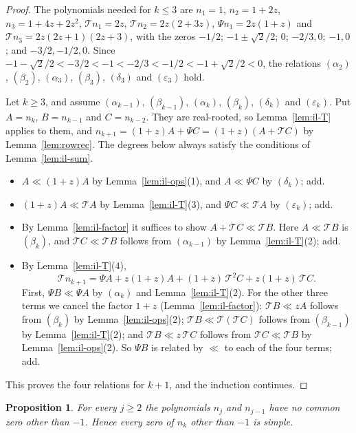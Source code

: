 \documentclass[11pt]{amsart}
\newtheorem{proposition}[theorem]{Proposition}
\theoremstyle{definition}
\begin{document}
\begin{proof}
The polynomials needed for $k\le3$ are $n_1=1$, $n_2=1+2z$, $n_3=1+4z+2z^2$, $\mathcal Tn_1=2z$, $\mathcal Tn_2=2z(2+3z)$, $\Psi n_1=2z(1+z)$ and $\mathcal Tn_3=2z(2z+1)(2z+3)$, with the zeros $-1/2$; $-1\pm\sqrt2/2$; $0$; $-2/3,0$; $-1,0$; and $-3/2,-1/2,0$. Since $-1-\sqrt2/2<-3/2<-1<-2/3<-1/2<-1+\sqrt2/2<0$, the relations $(\alpha_2)$, $(\beta_2)$, $(\alpha_3)$, $(\beta_3)$, $(\delta_3)$ and $(\varepsilon_3)$ hold.

Let $k\ge3$, and assume $(\alpha_{k-1})$, $(\beta_{k-1})$, $(\alpha_k)$, $(\beta_k)$, $(\delta_k)$ and $(\varepsilon_k)$. Put $A=n_k$, $B=n_{k-1}$ and $C=n_{k-2}$. They are real-rooted, so Lemma~\ref{lem:il-T} applies to them, and $n_{k+1}=(1+z)A+\Psi C=(1+z)(A+\mathcal TC)$ by Lemma~\ref{lem:rowrec}. The degrees below always satisfy the conditions of Lemma~\ref{lem:il-sum}.
\begin{itemize}
\item[$(\alpha_{k+1})$] $A\ll(1+z)A$ by Lemma~\ref{lem:il-ops}(1), and $A\ll\Psi C$ by $(\delta_k)$; add.
\item[$(\beta_{k+1})$] $(1+z)A\ll\mathcal TA$ by Lemma~\ref{lem:il-T}(3), and $\Psi C\ll\mathcal TA$ by $(\varepsilon_k)$; add.
\item[$(\delta_{k+1})$] By Lemma~\ref{lem:il-factor} it suffices to show $A+\mathcal TC\ll\mathcal TB$. Here $A\ll\mathcal TB$ is $(\beta_k)$, and $\mathcal TC\ll\mathcal TB$ follows from $(\alpha_{k-1})$ by Lemma~\ref{lem:il-T}(2); add.
\item[$(\varepsilon_{k+1})$] By Lemma~\ref{lem:il-T}(4),
\[
  \mathcal Tn_{k+1}=\Psi A+z(1+z)A+(1+z)\,\mathcal T^2C+z(1+z)\,\mathcal TC .
\]
First, $\Psi B\ll\Psi A$ by $(\alpha_k)$ and Lemma~\ref{lem:il-T}(2). For the other three terms we cancel the factor $1+z$ (Lemma~\ref{lem:il-factor}): $\mathcal TB\ll zA$ follows from $(\beta_k)$ by Lemma~\ref{lem:il-ops}(2); $\mathcal TB\ll\mathcal T(\mathcal TC)$ follows from $(\beta_{k-1})$ by Lemma~\ref{lem:il-T}(2); and $\mathcal TB\ll z\,\mathcal TC$ follows from $\mathcal TC\ll\mathcal TB$ by Lemma~\ref{lem:il-ops}(2). So $\Psi B$ is related by $\ll$ to each of the four terms; add.
\end{itemize}
This proves the four relations for $k+1$, and the induction continues.
\end{proof}

\begin{proposition}\label{prop:simple}
For every $j\ge2$ the polynomials $n_j$ and $n_{j-1}$ have no common zero other than $-1$. Hence every zero of $n_k$ other than $-1$ is simple.
\end{proposition}
\end{document}
